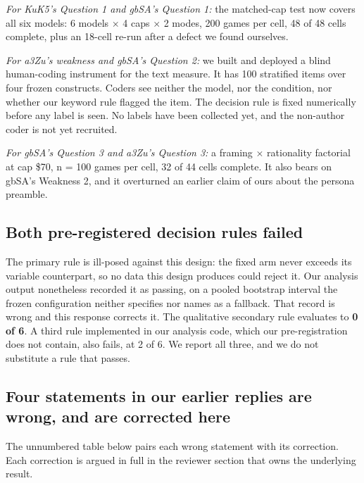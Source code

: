\documentclass[11pt]{article}
\begin{document}
\emph{For KuK5's Question 1 and gbSA's Question 1:} the matched-cap test now covers all six
models: 6 models $\times$ 4 caps $\times$ 2 modes, 200 games per cell, 48 of 48 cells complete,
plus an 18-cell re-run after a defect we found ourselves.

\emph{For a3Zu's weakness and gbSA's Question 2:} we built and deployed a blind human-coding
instrument for the text measure. It has 100 stratified items over four frozen constructs. Coders
see neither the model, nor the condition, nor whether our keyword rule flagged the item. The
decision rule is fixed numerically before any label is seen. No labels have been collected yet,
and the non-author coder is not yet recruited.

\emph{For gbSA's Question 3 and a3Zu's Question 3:} a framing $\times$ rationality factorial at
cap \$70, n = 100 games per cell, 32 of 44 cells complete. It also bears on gbSA's Weakness 2,
and it overturned an earlier claim of ours about the persona preamble.

\subsection*{Both pre-registered decision rules failed}

The primary rule is ill-posed against this design: the fixed arm never exceeds its variable
counterpart, so no data this design produces could reject it. Our analysis output nonetheless
recorded it as passing, on a pooled bootstrap interval the frozen configuration neither specifies
nor names as a fallback. That record is wrong and this response corrects it. The qualitative
secondary rule evaluates to \textbf{0 of 6}. A third rule implemented in our analysis code, which
our pre-registration does not contain, also fails, at 2 of 6. We report all three, and we do not
substitute a rule that passes.

\subsection*{Four statements in our earlier replies are wrong, and are corrected here}

The unnumbered table below pairs each wrong statement with its correction. Each correction is
argued in full in the reviewer section that owns the underlying result.
\end{document}
